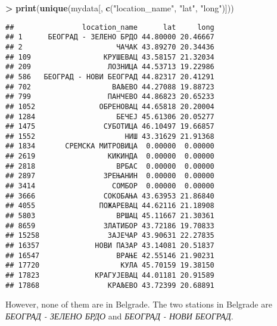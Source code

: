 \documentclass[
]{article}
\newenvironment{Shaded}{\begin{snugshade}}{\end{snugshade}}
\newcommand{\KeywordTok}[1]{\textcolor[rgb]{0.13,0.29,0.53}{\textbf{#1}}}
\newcommand{\NormalTok}[1]{#1}
\newcommand{\OperatorTok}[1]{\textcolor[rgb]{0.81,0.36,0.00}{\textbf{#1}}}
\newcommand{\StringTok}[1]{\textcolor[rgb]{0.31,0.60,0.02}{#1}}
\begin{document}
\begin{Shaded}
\begin{Highlighting}[]
\OperatorTok{>}\StringTok{ }\KeywordTok{print}\NormalTok{(}\KeywordTok{unique}\NormalTok{(mydata[, }\KeywordTok{c}\NormalTok{(}\StringTok{"location\_name"}\NormalTok{, }\StringTok{"lat"}\NormalTok{, }\StringTok{"long"}\NormalTok{)]))}
\end{Highlighting}
\end{Shaded}

\begin{verbatim}
##                location_name      lat     long
## 1      БЕОГРАД - ЗЕЛЕНО БРДО 44.80000 20.46667
## 2                      ЧАЧАК 43.89270 20.34436
## 109                 КРУШЕВАЦ 43.58157 21.32034
## 209                  ЛОЗНИЦА 44.53713 19.22986
## 586   БЕОГРАД - НОВИ БЕОГРАД 44.82317 20.41291
## 702                   ВАЉЕВО 44.27088 19.88723
## 799                  ПАНЧЕВО 44.86823 20.65233
## 1052               ОБРЕНОВАЦ 44.65818 20.20004
## 1284                   БЕЧЕЈ 45.61306 20.05277
## 1475                СУБОТИЦА 46.10497 19.66857
## 1552                     НИШ 43.31629 21.91368
## 1834       СРЕМСКА МИТРОВИЦА  0.00000  0.00000
## 2619                 КИКИНДА  0.00000  0.00000
## 2818                   ВРБАС  0.00000  0.00000
## 2897                ЗРЕЊАНИН  0.00000  0.00000
## 3414                  СОМБОР  0.00000  0.00000
## 3666                СОКОБАЊА 43.63953 21.86840
## 4055               ПОЖАРЕВАЦ 44.62116 21.18908
## 5803                   ВРШАЦ 45.11667 21.30361
## 8659                ЗЛАТИБОР 43.72186 19.70833
## 15258                ЗАЈЕЧАР 43.90631 22.27835
## 16357             НОВИ ПАЗАР 43.14081 20.51837
## 16547                  ВРАЊЕ 42.55146 21.90231
## 17720                   КУЛА 45.70159 19.38150
## 17823             КРАГУЈЕВАЦ 44.01181 20.91589
## 17868                КРАЉЕВО 43.72399 20.68891
\end{verbatim}

However, none of them are in Belgrade. The two stations in Belgrade are
\emph{БЕОГРАД - ЗЕЛЕНО БРДО} and \emph{БЕОГРАД - НОВИ БЕОГРАД}.
\end{document}
